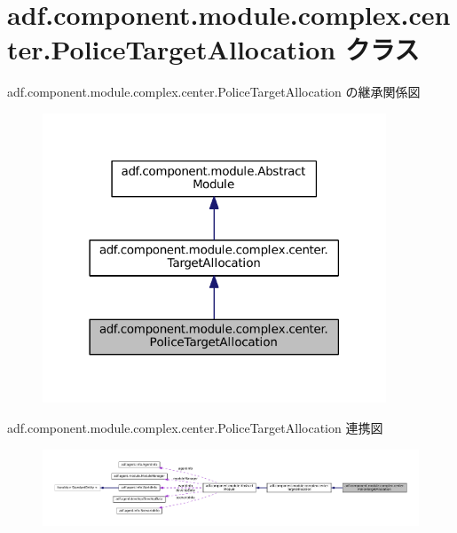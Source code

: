 \hypertarget{classadf_1_1component_1_1module_1_1complex_1_1center_1_1PoliceTargetAllocation}{}\section{adf.\+component.\+module.\+complex.\+center.\+Police\+Target\+Allocation クラス}
\label{classadf_1_1component_1_1module_1_1complex_1_1center_1_1PoliceTargetAllocation}


adf.\+component.\+module.\+complex.\+center.\+Police\+Target\+Allocation の継承関係図
\nopagebreak
\begin{figure}[H]
\begin{center}
\leavevmode
\includegraphics[width=290pt]{classadf_1_1component_1_1module_1_1complex_1_1center_1_1PoliceTargetAllocation__inherit__graph}
\end{center}
\end{figure}


adf.\+component.\+module.\+complex.\+center.\+Police\+Target\+Allocation 連携図
\nopagebreak
\begin{figure}[H]
\begin{center}
\leavevmode
\includegraphics[width=350pt]{classadf_1_1component_1_1module_1_1complex_1_1center_1_1PoliceTargetAllocation__coll__graph}
\end{center}
\end{figure}
